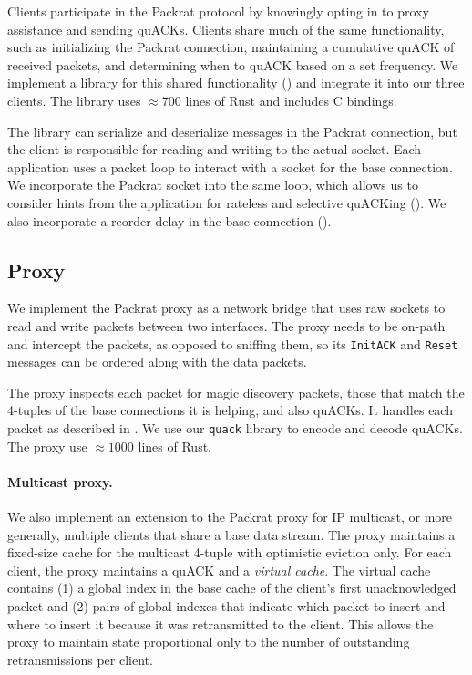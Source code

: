 

Clients participate in the Packrat protocol by knowingly opting in to proxy
assistance and sending quACKs. Clients share much of the same functionality,
such as initializing the Packrat connection, maintaining a cumulative quACK of
received packets, and determining when to quACK based on a set frequency. We
implement a library for this shared functionality ()
and integrate it into our three clients.
The library uses $\approx\!700$ lines of Rust and includes C bindings.

The library can serialize and deserialize messages in the Packrat connection, but
the client is responsible for reading and writing to the actual socket. Each
application uses a packet loop to interact with a socket for the base
connection. We incorporate the Packrat socket into the same loop, which allows us to
consider hints from the application for rateless and selective quACKing
(). We also
incorporate a reorder delay in the base connection ().

\subsection{Proxy}
\label{sec:packrat:implementation:proxy}

We implement the Packrat proxy as a network bridge that uses raw sockets to read
and write packets between two interfaces. The proxy needs to
be on-path and intercept the packets, as opposed to sniffing them, so
its \texttt{InitACK} and \texttt{Reset} messages can be ordered along with the
data packets.

The proxy inspects each packet for magic discovery packets, those that match the
4-tuples of the base connections it is helping, and also quACKs. It handles
each packet as described in . We use
our \texttt{quack} library to encode and decode quACKs. The proxy use
$\approx\!1000$ lines of Rust.

\paragraph{Multicast proxy.}

We also implement an extension to the Packrat proxy for IP multicast, or more
generally, multiple clients that share a base data stream. The proxy maintains
a fixed-size cache for the multicast 4-tuple with optimistic eviction only. For
each client, the proxy maintains a quACK and a \textit{virtual cache}. The
virtual cache contains (1) a global index in the base cache of the client's
first unacknowledged packet and (2) pairs of global indexes that indicate which
packet to insert and where to insert it because it was retransmitted to the
client. This allows the proxy to maintain state proportional only to the number
of outstanding retransmissions per client.

